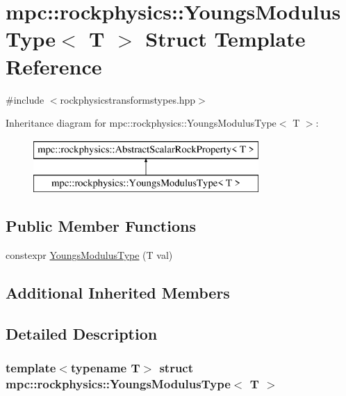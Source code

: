 \hypertarget{structmpc_1_1rockphysics_1_1_youngs_modulus_type}{}\section{mpc\+:\+:rockphysics\+:\+:Youngs\+Modulus\+Type$<$ T $>$ Struct Template Reference}
\label{structmpc_1_1rockphysics_1_1_youngs_modulus_type}


{\ttfamily \#include $<$rockphysicstransformstypes.\+hpp$>$}

Inheritance diagram for mpc\+:\+:rockphysics\+:\+:Youngs\+Modulus\+Type$<$ T $>$\+:\begin{figure}[H]
\begin{center}
\leavevmode
\includegraphics[height=2.000000cm]{structmpc_1_1rockphysics_1_1_youngs_modulus_type}
\end{center}
\end{figure}
\subsection*{Public Member Functions}
\begin{DoxyCompactItemize}
\item 
constexpr \mbox{\hyperlink{structmpc_1_1rockphysics_1_1_youngs_modulus_type_aa7eea6b3c1ef9af10982c210c56f7582}{Youngs\+Modulus\+Type}} (T val)
\end{DoxyCompactItemize}
\subsection*{Additional Inherited Members}


\subsection{Detailed Description}
\subsubsection*{template$<$typename T$>$\newline
struct mpc\+::rockphysics\+::\+Youngs\+Modulus\+Type$<$ T $>$}



